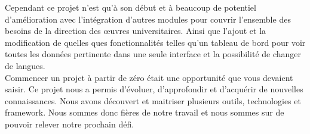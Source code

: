 Cependant ce projet n'est qu'à son début et à beaucoup de potentiel d'amélioration avec l'intégration d'autres modules pour couvrir l'ensemble des besoins de la direction des œuvres universitaires. Ainsi que l'ajout et la modification de quelles ques fonctionnalités telles qu'un tableau de bord pour voir toutes les données pertinente dans une seule interface et la possibilité de changer de langues.\\

Commencer un projet à partir de zéro était une opportunité que vous devaient saisir. Ce projet nous a permis d'évoluer, d'approfondir et d'acquérir de nouvelles connaissances. Nous avons découvert et maitriser plusieurs outils, technologies et framework. Nous sommes donc fières de notre travail et nous sommes sur de pouvoir relever notre prochain défi.\\
